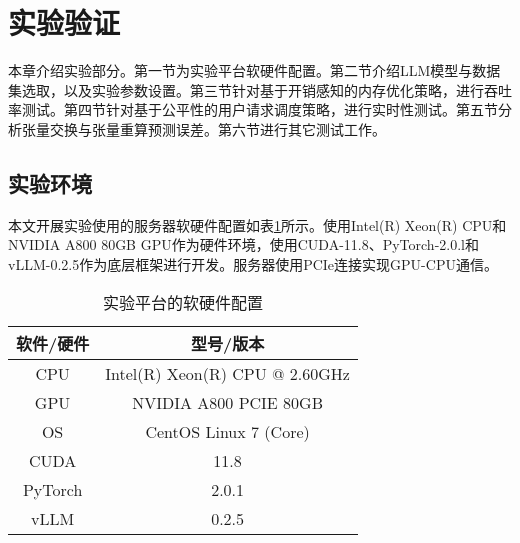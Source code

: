 \section{实验验证}

本章介绍实验部分。第一节为实验平台软硬件配置。第二节介绍LLM模型与数据集选取，以及实验参数设置。第三节针对基于开销感知的内存优化策略，进行吞吐率测试。第四节针对基于公平性的用户请求调度策略，进行实时性测试。第五节分析张量交换与张量重算预测误差。第六节进行其它测试工作。

\subsection{实验环境}

本文开展实验使用的服务器软硬件配置如表\ref{Table:实验平台的软硬件配置}所示。使用Intel(R) Xeon(R) CPU和NVIDIA A800 80GB GPU作为硬件环境，使用CUDA-11.8、PyTorch-2.0.l和vLLM-0.2.5作为底层框架进行开发。服务器使用PCIe连接实现GPU-CPU通信。

\begin{table}[H]
  \centering
  \caption{实验平台的软硬件配置}
  \label{Table:实验平台的软硬件配置}
  \renewcommand{\arraystretch}{1.15}
  \small
  \begin{tabular}{c c}
    \toprule
    \textbf{软件/硬件} & \textbf{型号/版本} \\ 
    \midrule
    CPU & Intel(R) Xeon(R) CPU @ 2.60GHz  \\ 
    GPU & NVIDIA A800 PCIE 80GB \\ 
    OS & CentOS Linux 7 (Core) \\ 
    CUDA & 11.8 \\ 
    PyTorch & 2.0.1 \\ 
    vLLM & 0.2.5 \\ 
    \bottomrule
  \end{tabular}
\end{table}


